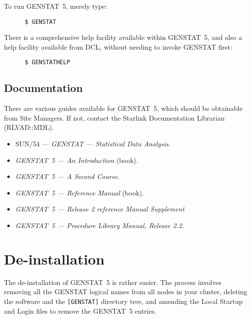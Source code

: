To run GENSTAT~5, merely type:
\begin{verbatim}
      $ GENSTAT
\end{verbatim}
There is a comprehensive help facility available within GENSTAT~5, and also a
help facility available from DCL, without needing to invoke GENSTAT first:
\begin{verbatim}
      $ GENSTATHELP
\end{verbatim}

\subsection{Documentation}

There are various guides available for GENSTAT~5, which should be obtainable
from Site Managers. If not, contact the Starlink Documentation Librarian
(RLVAD::MDL).
\begin{itemize}
\item SUN/54 --- {\em GENSTAT --- Statistical Data Analysis}.
\item {\em GENSTAT~5 --- An Introduction} (book).
\item {\em GENSTAT~5 --- A Second Course}.
\item {\em GENSTAT~5 --- Reference Manual} (book).
\item {\em GENSTAT~5 --- Release 2 reference Manual Supplement}
\item {\em GENSTAT~5 --- Procedure Library Manual, Release 2.2}.
\end{itemize}

\section{De-installation}

The de-installation of GENSTAT~5 is rather easier. The process involves removing
all the GENSTAT logical names from all nodes in your cluster, deleting the
software and the {\tt [GENSTAT]} directory tree, and amending the
Local Startup and Login files to remove the GENSTAT~5 entries.

